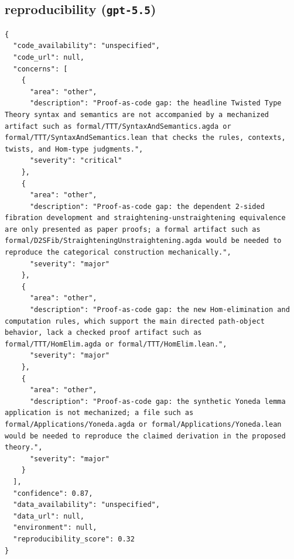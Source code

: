 \documentclass[11pt]{article}
\begin{document}
\subsection*{reproducibility (\texttt{gpt-5.5})}
\begin{verbatim}
{
  "code_availability": "unspecified",
  "code_url": null,
  "concerns": [
    {
      "area": "other",
      "description": "Proof-as-code gap: the headline Twisted Type Theory syntax and semantics are not accompanied by a mechanized artifact such as formal/TTT/SyntaxAndSemantics.agda or formal/TTT/SyntaxAndSemantics.lean that checks the rules, contexts, twists, and Hom-type judgments.",
      "severity": "critical"
    },
    {
      "area": "other",
      "description": "Proof-as-code gap: the dependent 2-sided fibration development and straightening-unstraightening equivalence are only presented as paper proofs; a formal artifact such as formal/D2SFib/StraighteningUnstraightening.agda would be needed to reproduce the categorical construction mechanically.",
      "severity": "major"
    },
    {
      "area": "other",
      "description": "Proof-as-code gap: the new Hom-elimination and computation rules, which support the main directed path-object behavior, lack a checked proof artifact such as formal/TTT/HomElim.agda or formal/TTT/HomElim.lean.",
      "severity": "major"
    },
    {
      "area": "other",
      "description": "Proof-as-code gap: the synthetic Yoneda lemma application is not mechanized; a file such as formal/Applications/Yoneda.agda or formal/Applications/Yoneda.lean would be needed to reproduce the claimed derivation in the proposed theory.",
      "severity": "major"
    }
  ],
  "confidence": 0.87,
  "data_availability": "unspecified",
  "data_url": null,
  "environment": null,
  "reproducibility_score": 0.32
}
\end{verbatim}
\end{document}
